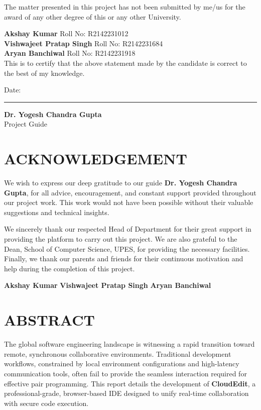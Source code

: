 \documentclass[12pt,a4paper]{report}
\begin{document}
The matter presented in this project has not been submitted by me/us for the award of any other degree of this or any other University.

\vspace{3cm}
\noindent \textbf{Akshay Kumar} \hfill Roll No: R2142231012 \\
\noindent \textbf{Vishwajeet Pratap Singh} \hfill Roll No: R2142231684 \\
\noindent \textbf{Aryan Banchiwal} \hfill Roll No: R2142231918 \\

\vspace{2cm}
\noindent This is to certify that the above statement made by the candidate is correct to the best of my knowledge.

\vspace{1.5cm}
\noindent Date: \rule{3cm}{0.4pt} \hfill \textbf{Dr. Yogesh Chandra Gupta} \\
\hfill Project Guide

\newpage

\chapter*{ACKNOWLEDGEMENT}
We wish to express our deep gratitude to our guide \textbf{Dr. Yogesh Chandra Gupta}, for all advice, encouragement, and constant support provided throughout our project work. This work would not have been possible without their valuable suggestions and technical insights.

We sincerely thank our respected Head of Department for their great support in providing the platform to carry out this project. We are also grateful to the Dean, School of Computer Science, UPES, for providing the necessary facilities. Finally, we thank our parents and friends for their continuous motivation and help during the completion of this project.

\vspace{2.5cm}
\noindent \textbf{Akshay Kumar} \hfill \textbf{Vishwajeet Pratap Singh} \hfill \textbf{Aryan Banchiwal}

\newpage

\chapter*{ABSTRACT}
The global software engineering landscape is witnessing a rapid transition toward remote, synchronous collaborative environments. Traditional development workflows, constrained by local environment configurations and high-latency communication tools, often fail to provide the seamless interaction required for effective pair programming. This report details the development of \textbf{CloudEdit}, a professional-grade, browser-based IDE designed to unify real-time collaboration with secure code execution.
\end{document}
